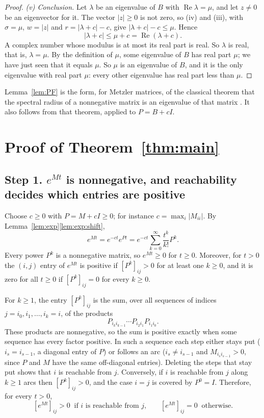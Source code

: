 \documentclass[11pt]{article}
\theoremstyle{definition}
\theoremstyle{remark}
\renewcommand{\Re}{\operatorname{Re}}
\begin{document}
\begin{proof}
\emph{\textup{(v)} Conclusion.} Let $\lambda$ be an eigenvalue of $B$ with $\Re\lambda = \mu$, and
let $z \ne 0$ be an eigenvector for it. The vector $|z| \ge 0$ is not zero, so (iv) and (iii), with
$\sigma = \mu$, $w = |z|$ and $r = |\lambda + c| - c$, give $|\lambda + c| - c \le \mu$. Hence
\[
  |\lambda + c| \le \mu + c = \Re(\lambda + c) .
\]
A complex number whose modulus is at most its real part is real. So $\lambda$ is real, that is,
$\lambda = \mu$. By the definition of $\mu$, some eigenvalue of $B$ has real part $\mu$; we have
just seen that it equals $\mu$. So $\mu$ is an eigenvalue of $B$, and it is the only eigenvalue
with real part $\mu$: every other eigenvalue has real part less than $\mu$.
\end{proof}

Lemma~\ref{lem:PF} is the form, for Metzler matrices, of the classical theorem that the spectral
radius of a nonnegative matrix is an eigenvalue of that matrix
\cite[Theorem~8.3.1]{HJ}. It also follows from that theorem, applied to $P = B + cI$.

\section{Proof of Theorem~\ref{thm:main}}\label{sec:proof}

\subsection*{Step 1. $e^{Mt}$ is nonnegative, and reachability decides which entries are positive}

Choose $c \ge 0$ with $P = M + cI \ge 0$; for instance $c = \max_i |M_{ii}|$. By
Lemma~\ref{lem:exp}\ref{lem:exp:shift},
\[
  e^{Mt} = e^{-ct} e^{Pt} = e^{-ct} \sum_{k=0}^{\infty} \frac{t^{k}}{k!} P^{k} .
\]
Every power $P^k$ is a nonnegative matrix, so $e^{Mt} \ge 0$ for $t \ge 0$. Moreover, for $t > 0$
the $(i,j)$ entry of $e^{Mt}$ is positive if $[P^k]_{ij} > 0$ for at least one $k \ge 0$, and it is
zero for all $t \ge 0$ if $[P^k]_{ij} = 0$ for every $k \ge 0$.

For $k \ge 1$, the entry $[P^k]_{ij}$ is the sum, over all sequences of indices $j = i_0, i_1, \dots, i_k = i$,
of the products
\[
  P_{i_k i_{k-1}} \cdots P_{i_2 i_1} P_{i_1 i_0} .
\]
These products are nonnegative, so the sum is positive exactly when some sequence has every factor
positive. In such a sequence each step
either stays put ($i_s = i_{s-1}$, a diagonal entry of $P$) or follows an arc
($i_s \ne i_{s-1}$ and $M_{i_s i_{s-1}} > 0$, since $P$ and $M$ have the same off-diagonal
entries). Deleting the steps that stay put shows that $i$ is reachable from $j$. Conversely, if $i$
is reachable from $j$ along $k \ge 1$ arcs then $[P^k]_{ij} > 0$, and the case $i = j$ is covered by
$P^0 = I$. Therefore, for every $t > 0$,
\begin{equation}\label{eq:pattern}
  [e^{Mt}]_{ij} > 0 \ \text{ if $i$ is reachable from $j$,}
  \qquad
  [e^{Mt}]_{ij} = 0 \ \text{ otherwise.}
\end{equation}
\end{document}

